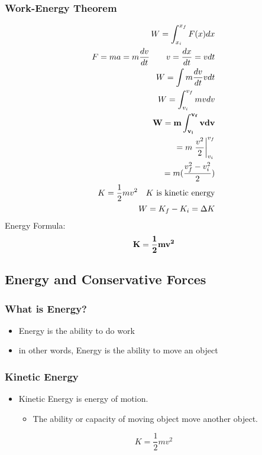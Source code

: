 \documentclass[12pt]{article}
\theoremstyle{break}
\numberwithin{theorem}{subsection}
\numberwithin{lemma}{subsection}
\numberwithin{corollary}{subsection}
\numberwithin{equation}{subsection}
\begin{document}
\subsubsection{Work-Energy Theorem}
\begin{align*}
W = \int_{x_i}^{x_f} F(x) dx \\
F = ma = m \frac{dv}{dt} \qquad v = \frac{dx}{dt} = vdt \\
W = \int m \frac{dv}{dt} v dt \\
W = \int_{v_i}^{v_f} m v dv  \\
{\bf W = m \int_{v_i}^{v_f} v dv} \\
= m \left. \frac{v^2}{2} \right|_{v_i}^{v_f} \\
= m (\frac{v_f^2 - v_i^2}{2}) \\
K = \frac12 mv^2 \quad \text{$K$ is kinetic energy} \\
W = K_f - K_i = \Delta K
\end{align*}
Energy Formula:
\begin{equation*}
	{\bf K = \frac{1}{2} mv^2}
\end{equation*}

\subsection{Energy and Conservative Forces}

\subsubsection{What is Energy?}
\begin{itemize}
	\item Energy is the ability to do work
	\item in other words, Energy is the ability to move an object
\end{itemize}

\subsubsection{Kinetic Energy}
\begin{itemize}
	\item Kinetic Energy is energy of motion.
	\begin{itemize}
		\item The ability or capacity of moving object move another object.
	\end{itemize}
\end{itemize}
\begin{equation*}
	K = \frac12 mv^2
\end{equation*}
\end{document}
